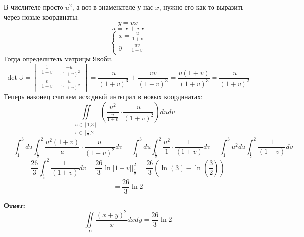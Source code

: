 \documentclass[a4paper,12pt]{article}
\begin{document}
В числителе просто $u^2$, а вот в знаменателе у нас $x$, нужно его как-то выразить через новые координаты:
\[
y = vx
\]
\[
u = x + vx
\]
\[
\begin{cases}
x = \frac{u}{1 + v}
\\
y = \frac{uv}{1 + v}
\end{cases}
\]
Тогда определитель матрицы Якоби:
\[
\det \mathbb{J} = \begin{vmatrix}
\frac{1}{1 + v} & \frac{-u}{(1+v)^2} \\ \frac{v}{1+v} & \frac{u}{(1+v)^2}
\end{vmatrix} =
\frac{u}{(1+v)^3} + \frac{uv}{(1+v)^3} = \frac{u(1 + v)}{(1+v)^3} = \frac{u}{(1+v)^2}
\]
Теперь наконец считаем исходный интеграл в новых координатах:
\[
\iint\limits_{\begin{matrix} u \in [1, 3]\\ v \in \left[\frac12, 2\right]\end{matrix}} \left( \frac{u^2}{\frac{u}{1+v}} \cdot \frac{u}{(1+v)^2} \right)du dv =
\]
\[
=
\int_1^3 du \int_{\frac12}^2 \frac{u^2(1+v)}{u} \cdot \frac{u}{(1+v)^2} dv = \int_1^3 du \int_{\frac12}^2 \frac{u^2}{1} \cdot \frac{1}{(1+v)} dv  =\int_1^3 u^2 du \int_{\frac12}^2 \frac{1}{(1+v)} dv  = 
\]
\[
= \frac{26}{3}\int_{\frac12}^2 \frac{1}{(1+v)} dv  = \frac{26}{3} \ln |1 + v| \Bigg|_{\frac{1}{2}}^2 = \frac{26}{3} \left( \ln(3) - \ln\left(\frac{3}{2}\right)\right) = 
\]
\[
=
\frac{26}{3} \ln 2
\]
\begin{center}
\textbf{Ответ: } 
\[
\iint\limits_D \frac{(x+y)^2}{x}dxdy = \frac{26}{3} \ln 2
\]
\end{center}
\clearpage
\end{document}

